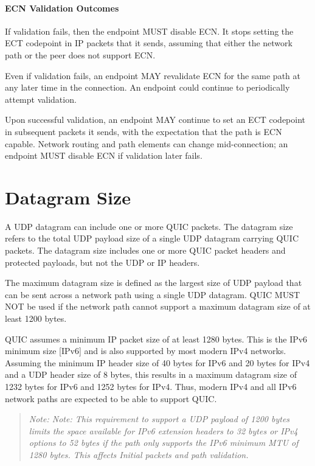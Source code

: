 \documentclass{article}
\begin{document}
\paragraph{ECN Validation Outcomes}

If validation fails, then the endpoint MUST disable ECN.  It stops setting the ECT codepoint in IP packets that it sends, assuming that either the network path or the peer does not support ECN.

Even if validation fails, an endpoint MAY revalidate ECN for the same path at any later time in the connection.  An endpoint could continue to periodically attempt validation.

Upon successful validation, an endpoint MAY continue to set an ECT codepoint in subsequent packets it sends, with the expectation that the path is ECN capable.  Network routing and path elements can change mid-connection; an endpoint MUST disable ECN if validation later fails.

\section{Datagram Size}

A UDP datagram can include one or more QUIC packets.  The datagram size refers to the total UDP payload size of a single UDP datagram carrying QUIC packets.  The datagram size includes one or more QUIC packet headers and protected payloads, but not the UDP or IP headers.

The maximum datagram size is defined as the largest size of UDP payload that can be sent across a network path using a single UDP datagram.  QUIC MUST NOT be used if the network path cannot support a maximum datagram size of at least 1200 bytes.

QUIC assumes a minimum IP packet size of at least 1280 bytes.  This is the IPv6 minimum size [IPv6] and is also supported by most modern IPv4 networks.  Assuming the minimum IP header size of 40 bytes for IPv6 and 20 bytes for IPv4 and a UDP header size of 8 bytes, this results in a maximum datagram size of 1232 bytes for IPv6 and 1252 bytes for IPv4.  Thus, modern IPv4 and all IPv6 network paths are expected to be able to support QUIC.

\begin{quote}
\textit{Note: Note: This requirement to support a UDP payload of 1200 bytes limits the space available for IPv6 extension headers to 32 bytes or IPv4 options to 52 bytes if the path only supports the IPv6 minimum MTU of 1280 bytes.  This affects Initial packets and path validation.}
\end{quote}
\end{document}
